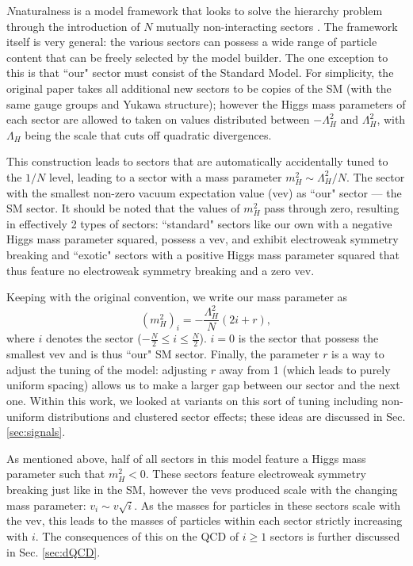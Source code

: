 \documentclass[nofootinbib,twocolumn,preprintnumbers]{revtex4-1}
\begin{document}
$N$naturalness is a model framework that looks to solve the hierarchy problem through the introduction of $N$ mutually non-interacting sectors \cite{Arkani-Hamed:2016rle}. The framework itself is very general: the various sectors can possess a wide range of particle content that can be freely selected by the model builder. The one exception to this is that ``our" sector must consist of the Standard Model. For simplicity, the original paper takes all additional new sectors to be copies of the SM (with the same gauge groups and Yukawa structure); however the Higgs mass parameters of each sector are allowed to taken on values distributed between $-\Lambda_H^2$ and $\Lambda^2_H$, with $\Lambda_H$ being the scale that cuts off quadratic divergences.

This construction leads to sectors that are automatically accidentally tuned to the $1/N$ level, leading to a sector with a mass parameter $m_H^2 \sim \Lambda_H^2/N$. The sector with the smallest non-zero vacuum expectation value (vev) as ``our" sector --- the SM sector. It should be noted that the values of $m_H^2$ pass through zero, resulting in effectively 2 types of sectors: ``standard" sectors like our own with a negative Higgs mass parameter squared, possess a vev, and exhibit electroweak symmetry breaking and ``exotic" sectors with a positive Higgs mass parameter squared that thus feature no electroweak symmetry breaking and a zero vev. 

Keeping with the original convention, we write our mass parameter as
\begin{equation}\label{eqn:massParam}
\left(m_H^2\right)_i = -\frac{\Lambda_H^2}{N}(2i+r),
\end{equation}
where $i$ denotes the sector ($-\frac{N}{2}\leq i \leq \frac{N}{2}$). $i = 0$ is the sector that possess the smallest vev and is thus ``our" SM sector. Finally, the parameter $r$ is a way to adjust the tuning of the model: adjusting $r$ away from 1 (which leads to purely uniform spacing) allows us to make a larger gap between our sector and the next one. Within this work, we looked at variants on this sort of tuning including non-uniform distributions and clustered sector effects; these ideas are discussed in Sec. \ref{sec:signals}.   

As mentioned above, half of all sectors in this model feature a Higgs mass parameter such that $m_H^2 < 0$. These sectors feature electroweak symmetry breaking just like in the SM, however the vevs produced scale with the changing mass parameter: $v_i \sim v\sqrt{i}$. As the masses for particles in these sectors scale with the vev, this leads to the masses of particles within each sector strictly increasing with $i$. The consequences of this on the QCD of $i \geq 1$ sectors is further discussed in Sec. \ref{sec:dQCD}. 
\end{document}
